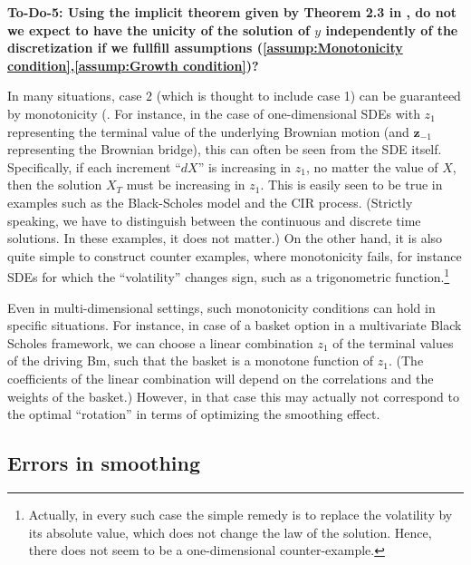 \documentclass[11pt]{article}
\begin{document}
\textbf{To-Do-5: Using the implicit theorem given by Theorem 2.3 in \cite{griebel2013smoothing}, do not we expect to have the unicity of the solution of $y$ independently of the discretization if we fullfill assumptions (\ref{assump:Monotonicity condition},\ref{assump:Growth condition})?}

In many situations, case $2$ (which is thought to include case 1) can be
guaranteed by monotonicity (. For instance, in the case of one-dimensional SDEs
with $z_1$ representing the terminal value of the underlying Brownian motion (and $\mathbf{z}_{-1}$ representing the Brownian bridge), this can often be seen from the SDE itself. Specifically, if each increment ``$dX$'' is increasing in $z_1$, no matter the value of $X$, then the solution $X_T$ must be increasing
in $z_1$. This is easily seen to be true in examples such as the Black-Scholes model and the CIR process. (Strictly speaking, we have to distinguish between the continuous and discrete time solutions. In these examples, it does not matter.) On the other hand, it is also quite simple to construct counter examples, where monotonicity fails, for instance SDEs for which the ``volatility'' changes sign, such as a trigonometric function.\footnote{Actually, in every such case the simple remedy is to replace the volatility by its absolute value, which does not change the law of the solution. Hence, there does not seem to be a one-dimensional counter-example.}

Even in multi-dimensional settings, such monotonicity conditions can hold in specific situations. For instance, in case of a basket option in a multivariate Black Scholes framework, we can choose a linear combination $z_1$ of the terminal values of the driving Bm, such that the basket is a monotone function of $z_1$. (The coefficients of the linear combination will depend on the correlations and the weights of the basket.) However, in that case this may actually not correspond to the optimal ``rotation'' in terms of optimizing the smoothing effect.

\subsection{Errors in smoothing}
\label{sec:errors-smoothing}
\end{document}
